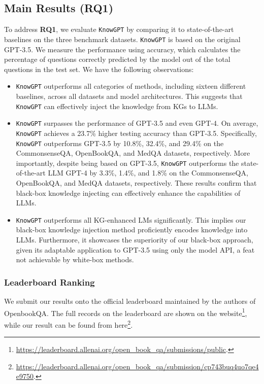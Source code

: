 \documentclass{article}
\theoremstyle{boldremark}
\begin{document}
\subsection{Main Results (RQ1)}
To address \textbf{RQ1}, we evaluate \texttt{KnowGPT} by comparing it to state-of-the-art baselines on the three benchmark datasets. 
\texttt{KnowGPT} is based on the original GPT-3.5. We measure the performance using accuracy, which calculates the percentage of questions correctly predicted by the model out of the total questions in the test set. We have the following observations:
\begin{itemize}[leftmargin=*]
    \item \texttt{KnowGPT} outperforms all categories of methods, including sixteen different baselines, across all datasets and model architectures. This suggests that \texttt{KnowGPT} can effectively inject the knowledge from KGs to LLMs.
    \item \texttt{KnowGPT} surpasses the performance of GPT-3.5 and even GPT-4. On average, \texttt{KnowGPT} achieves a 23.7\% higher testing accuracy than GPT-3.5. Specifically, \texttt{KnowGPT} outperforms GPT-3.5 by 10.8\%, 32.4\%, and 29.4\% on the CommonsenseQA, OpenBookQA, and MedQA datasets, respectively. More importantly, despite being based on GPT-3.5, \texttt{KnowGPT} outperforms the state-of-the-art LLM GPT-4 by 3.3\%, 1.4\%, and 1.8\% on the CommonsenseQA, OpenBookQA, and MedQA datasets, respectively. These results confirm that black-box knowledge injecting can effectively enhance the capabilities of LLMs.
    \item  \texttt{KnowGPT} outperforms all KG-enhanced LMs significantly. This implies our black-box knowledge injection method proficiently encodes knowledge into LLMs. Furthermore, it showcases the superiority of our black-box approach, given its adaptable application to GPT-3.5 using only the model API, a feat not achievable by white-box methods.
\end{itemize}

\subsubsection{Leaderboard Ranking}
We submit our results onto the official leaderboard maintained by the authors of OpenbookQA. The full records on the leaderboard are shown on the website\footnote{\url{https://leaderboard.allenai.org/open_book_qa/submissions/public}. 
}, while our result can be found from here\footnote{\url{https://leaderboard.allenai.org/open_book_qa/submission/cp743buq4uo7qe4e9750}.}.
\end{document}
